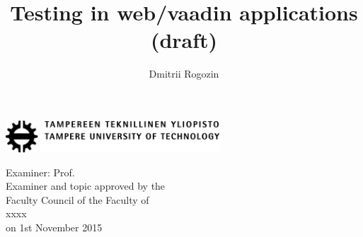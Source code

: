 \documentclass[12pt,a4paper,english%
]{tutthesis}
\author{Dmitrii Rogozin}
\title{Testing in web/vaadin applications (draft)}      %
\begin{document}
\thispagestyle{empty}
\vspace*{-1cm}\noindent
\includegraphics[width=8cm]{tty_tut_logo}   %

\vspace{6.8cm}
\maketitle
\vspace{7cm} %

\begin{flushright}  
  \begin{minipage}[c]{6.8cm}
    \begin{spacing}{1.0}
      \textsf{Examiner: Prof. \@examiner}\\
      \textsf{Examiner and topic approved by the}\\ 
      \textsf{Faculty Council of the Faculty of}\\
      \textsf{xxxx}\\
      \textsf{on 1st November 2015}\\
    \end{spacing}
  \end{minipage}
\end{flushright}

\if@twoside
\clearpage
\fi
%
\setcounter{page}{0} %


\end{document}
